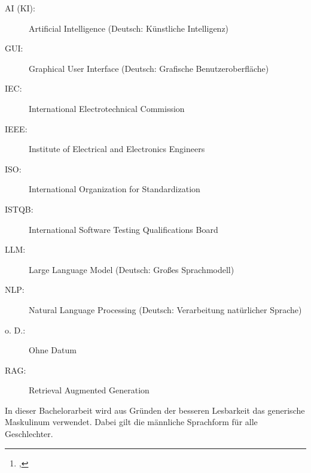 \documentclass[12pt,toc=bib,toc=listof]{scrreprt}
\title{\reprttopic}
\author{\reprtstudentname\footnote{\reprtstudentid, \reprtstudentmail}}
\begin{document}
\maketitle
{}

\tableofcontents

\label{sec:abkuerzungsverzeichnis}

\begin{description}
  \item[AI (KI):] Artificial Intelligence (Deutsch: Künstliche Intelligenz)
  \item[GUI:] Graphical User Interface (Deutsch: Grafische Benutzeroberfläche)
  \item[IEC:] International Electrotechnical Commission
  \item[IEEE:] Institute of Electrical and Electronics Engineers
  \item[ISO:] International Organization for Standardization
  \item[ISTQB:] International Software Testing Qualifications Board
  \item[LLM:] Large Language Model (Deutsch: Großes Sprachmodell)
  \item[NLP:] Natural Language Processing (Deutsch: Verarbeitung natürlicher Sprache)
  \item[o. D.:] Ohne Datum
  \item[RAG:] Retrieval Augmented Generation
\end{description}

\newpage
\listoffigures
\newpage
{} %
\label{sec:genderHinweis}
In dieser Bachelorarbeit wird aus Gründen der besseren Lesbarkeit das generische Maskulinum verwendet. Dabei gilt die männliche Sprachform für alle Geschlechter.
\end{document}
